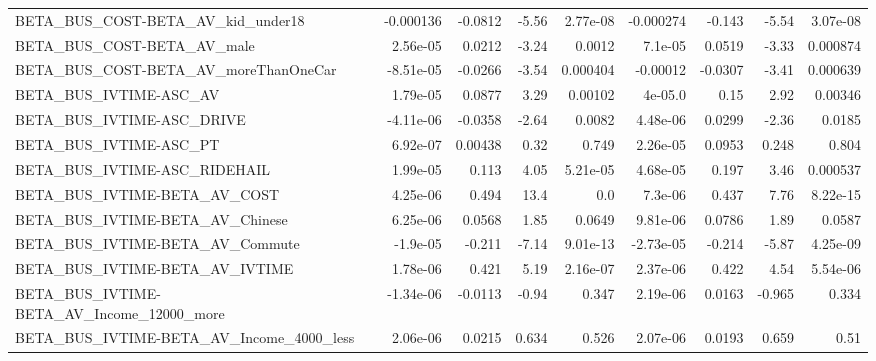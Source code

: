 \begin{tabular}{lrrrrrrrr}
BETA\_BUS\_COST-BETA\_AV\_kid\_under18                  &   -0.000136 &      -0.0812 &     -5.56 & 2.77e-08 &  -0.000274 &      -0.143 &        -5.54 &      3.07e-08 \\
BETA\_BUS\_COST-BETA\_AV\_male                         &    2.56e-05 &       0.0212 &     -3.24 &   0.0012 &    7.1e-05 &      0.0519 &        -3.33 &      0.000874 \\
BETA\_BUS\_COST-BETA\_AV\_moreThanOneCar               &   -8.51e-05 &      -0.0266 &     -3.54 & 0.000404 &   -0.00012 &     -0.0307 &        -3.41 &      0.000639 \\
BETA\_BUS\_IVTIME-ASC\_AV                             &    1.79e-05 &       0.0877 &      3.29 &  0.00102 &    4e-05.0 &        0.15 &         2.92 &       0.00346 \\
BETA\_BUS\_IVTIME-ASC\_DRIVE                          &   -4.11e-06 &      -0.0358 &     -2.64 &   0.0082 &   4.48e-06 &      0.0299 &        -2.36 &        0.0185 \\
BETA\_BUS\_IVTIME-ASC\_PT                             &    6.92e-07 &      0.00438 &      0.32 &    0.749 &   2.26e-05 &      0.0953 &        0.248 &         0.804 \\
BETA\_BUS\_IVTIME-ASC\_RIDEHAIL                       &    1.99e-05 &        0.113 &      4.05 & 5.21e-05 &   4.68e-05 &       0.197 &         3.46 &      0.000537 \\
BETA\_BUS\_IVTIME-BETA\_AV\_COST                       &    4.25e-06 &        0.494 &      13.4 &      0.0 &    7.3e-06 &       0.437 &         7.76 &      8.22e-15 \\
BETA\_BUS\_IVTIME-BETA\_AV\_Chinese                    &    6.25e-06 &       0.0568 &      1.85 &   0.0649 &   9.81e-06 &      0.0786 &         1.89 &        0.0587 \\
BETA\_BUS\_IVTIME-BETA\_AV\_Commute                    &    -1.9e-05 &       -0.211 &     -7.14 & 9.01e-13 &  -2.73e-05 &      -0.214 &        -5.87 &      4.25e-09 \\
BETA\_BUS\_IVTIME-BETA\_AV\_IVTIME                     &    1.78e-06 &        0.421 &      5.19 & 2.16e-07 &   2.37e-06 &       0.422 &         4.54 &      5.54e-06 \\
BETA\_BUS\_IVTIME-BETA\_AV\_Income\_12000\_more          &   -1.34e-06 &      -0.0113 &     -0.94 &    0.347 &   2.19e-06 &      0.0163 &       -0.965 &         0.334 \\
BETA\_BUS\_IVTIME-BETA\_AV\_Income\_4000\_less           &    2.06e-06 &       0.0215 &     0.634 &    0.526 &   2.07e-06 &      0.0193 &        0.659 &          0.51 \\

\end{tabular}
